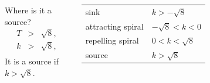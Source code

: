 \begin{frame}
\begin{columns}
     { Where is it a source?
      \begin{eqnarray*}
        T & > & \sqrt{8}, \\
        k & > & \sqrt{8}, \\
      \end{eqnarray*}
      It is a source if $k>\sqrt{8}$.  }


     {
      \begin{tabular}{ll}
        sink              & $k>-\sqrt{8}$\\
        attracting spiral & $-\sqrt{8} < k < 0$ \\
        repelling  spiral & $0 < k < \sqrt{8}$ \\
        source            & $k>\sqrt{8}$
      \end{tabular}
    }
  \end{columns}


\end{frame}




